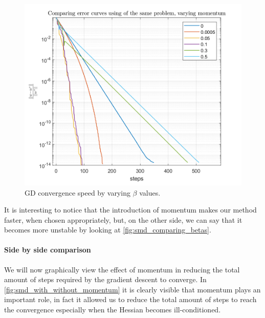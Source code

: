 \begin{figure}[H]
    \centering
    \includegraphics[width = 0.8\linewidth]{images/smd/momentum_comparison_smd.png}
    \caption{GD convergence speed by varying $\beta$ values.}
    \label{fig:smd_comparing_betas}
\end{figure}

\noindent It is interesting to notice that the introduction of momentum makes our method faster, when chosen appropriately, but, on the other side, we can say that it becomes more unstable by looking at \autoref{fig:smd_comparing_betas}.

\paragraph{Side by side comparison}
We will now graphically view the effect of momentum in reducing the total amount of steps required by the gradient descent to converge. In \autoref{fig:smd_with_without_momentum} it is clearly visible that momentum plays an important role, in fact it allowed us to reduce the total amount of steps to reach the convergence especially when the Hessian becomes ill-conditioned.

